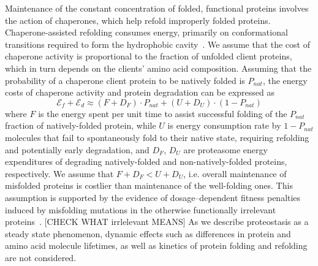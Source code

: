 \documentclass[10pt,letterpaper]{article}
\begin{document}
Maintenance of the constant concentration of folded, functional proteins involves the action of chaperones, which help refold improperly folded proteins. Chaperone-assisted refolding consumes energy, primarily on conformational transitions required to form the hydrophobic cavity~\cite{Hartl2011Molecular}. We assume that the cost of chaperone activity is proportional to the fraction of unfolded client proteins, which in turn depends on the clients' amino acid composition. 
Assuming that the probability of a chaperone client protein to be natively folded is $P_{nat}$, the energy costs of chaperone activity and protein degradation can be expressed as 
\begin{equation}
	\label{chaperone_degradation_cost}
	\mathcal{E}_{f} + \mathcal{E}_{d} \approx (F+D_{F})\cdot P_{nat} + (U+D_{U})\cdot\left(1-P_{nat}\right)
\end{equation}
where $F$ is the energy spent per unit time to assist successful folding of the $P_{nat}$ fraction of natively-folded protein, while $U$ is energy consumption rate by $1-P_{nat}$ molecules that fail to spontaneously fold to their native state, requiring refolding and potentially early degradation, and $D_F$, $D_U$ are proteasome energy expenditures of degrading natively-folded and non-natively-folded proteins, respectively. We assume that $F+D_{F}<U+D_{U}$, i.e. overall maintenance of misfolded proteins  is costlier than maintenance of the well-folding ones. This assumption is supported by the evidence of dosage--dependent fitness penalties induced by misfolding mutations in the otherwise functionally irrelevant proteins~\cite{Samerotte2011Misfolded}. [CHECK WHAT irrlelevant MEANS] As we describe proteostasis as a steady state phenomenon, dynamic effects such as differences in protein and amino acid molecule lifetimes, as well as kinetics of protein folding and refolding are not considered.

\end{document}
